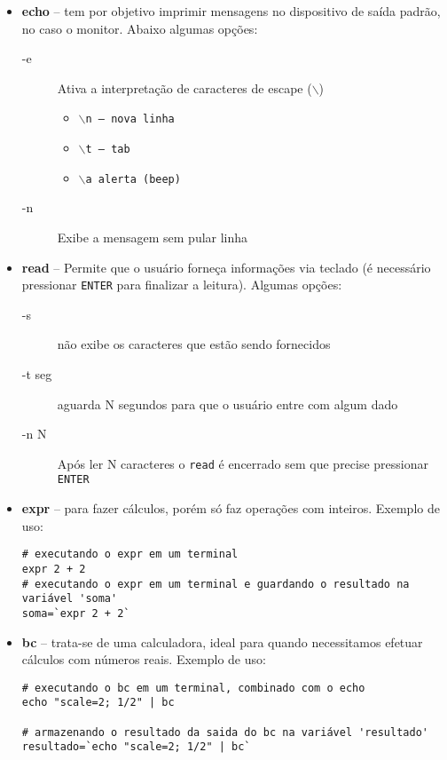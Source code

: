 \documentclass[11pt]{../classes/ifscarticle}
\begin{document}
\begin{itemize}
	\item \textbf{echo} -- tem por objetivo imprimir mensagens no dispositivo de saída padrão, no caso o monitor. Abaixo algumas opções:
	\begin{description}
		\item[-e] Ativa a interpretação de caracteres de escape (\texttt{$\backslash$})
		\begin{itemize}
			\item $\backslash$\texttt{n -- nova linha}
			\item $\backslash$\texttt{t -- tab}
			\item $\backslash$\texttt{a alerta (beep)}
		\end{itemize}
		\item[-n] Exibe a mensagem sem pular linha
	\end{description}
	\item \textbf{read} -- Permite que o usuário forneça informações via teclado (é necessário pressionar \texttt{ENTER} para finalizar a leitura). Algumas opções:
	\begin{description}
		\item[-s] não exibe os caracteres que estão sendo fornecidos
		\item[-t seg] aguarda N segundos para que o usuário entre com algum dado
		\item[-n N] Após ler N caracteres o \texttt{read} é encerrado sem que precise pressionar \texttt{ENTER} 
	\end{description}
	\item \textbf{expr} -- para fazer cálculos, porém só faz operações com inteiros. Exemplo de uso: 
\begin{lstlisting}
# executando o expr em um terminal
expr 2 + 2
# executando o expr em um terminal e guardando o resultado na variável 'soma'
soma=`expr 2 + 2`
\end{lstlisting}
	\item \textbf{bc} -- trata-se de uma calculadora, ideal para quando necessitamos efetuar cálculos com números reais. Exemplo de uso: 
\begin{lstlisting}
# executando o bc em um terminal, combinado com o echo
echo "scale=2; 1/2" | bc

# armazenando o resultado da saida do bc na variável 'resultado'
resultado=`echo "scale=2; 1/2" | bc`
\end{lstlisting}

\end{itemize}
\end{document}
